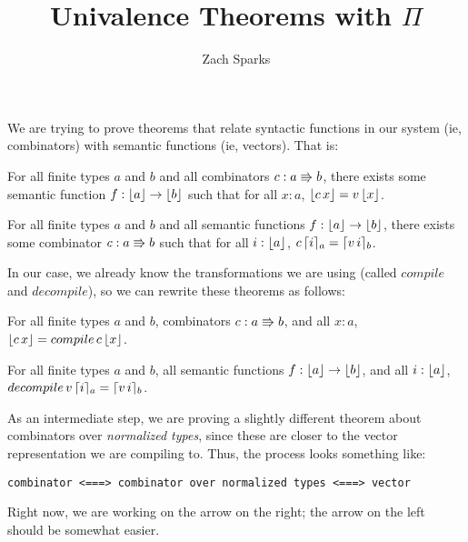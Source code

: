 \documentclass[11pt]{article}
\title{Univalence Theorems with $\Pi$}
\author{Zach Sparks}
\begin{document}
\maketitle

We are trying to prove theorems that relate syntactic functions in our system
(ie, combinators) with semantic functions (ie, vectors). That is:

For all finite types $a$ and $b$ and all combinators $c : a \combarrow b$, there
exists some semantic function $f : \tonat{a} \to \tonat{b}$ such that for all $x
: a$, $\tonat{c\,x} \eq v\,\tonat{x}$.

For all finite types $a$ and $b$ and all semantic functions $f : \tonat{a} \to
\tonat{b}$, there exists some combinator $c : a \combarrow b$ such that for all
$i : \tonat{a}$, $c\,\fromnat{a}{i} \eq \fromnat{b}{v\,i}$.

In our case, we already know the transformations we are using (called $compile$
and $decompile$), so we can rewrite these theorems as follows:

For all finite types $a$ and $b$, combinators $c : a \combarrow b$, and all $x :
a$, $\tonat{c\,x} \eq compile\,c\,\tonat{x}$.

For all finite types $a$ and $b$, all semantic functions $f : \tonat{a} \to
\tonat{b}$, and all $i : \tonat{a}$, $decompile\,v\,\fromnat{a}{i} \eq
\fromnat{b}{v\,i}$.

As an intermediate step, we are proving a slightly different theorem about
combinators over \emph{normalized types}, since these are closer to the vector
representation we are compiling to. Thus, the process looks something like:

\begin{verbatim}
combinator <===> combinator over normalized types <===> vector
\end{verbatim}

Right now, we are working on the arrow on the right; the arrow on the left
should be somewhat easier.
\end{document}

